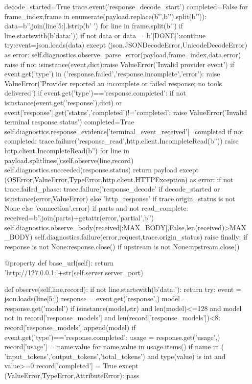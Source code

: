             decode_started=True
            trace.event('response_decode_start')
            completed=False
            for frame_index,frame in enumerate(payload.replace(b'\r\n',b'\n').split(b'\n\n')):
                data=b'\n'.join(line[5:].lstrip(b' ') for line in frame.split(b'\n') if line.startswith(b'data:'))
                if not data or data==b'[DONE]':continue
                try:event=json.loads(data)
                except (json.JSONDecodeError,UnicodeDecodeError) as error:
                    self.diagnostics.observe_parse_error(payload,frame_index,data,error)
                    raise
                if not isinstance(event,dict):raise ValueError('Invalid provider event')
                if event.get('type') in ('response.failed','response.incomplete','error'):
                    raise ValueError('Provider reported an incomplete or failed response; no tools delivered')
                if event.get('type')=='response.completed':
                    if not isinstance(event.get('response'),dict) or event['response'].get('status','completed')!='completed':
                        raise ValueError('Invalid terminal response status')
                    completed=True
            self.diagnostics.response_evidence['terminal_event_received']=completed
            if not completed:
                trace.failure('response_read',http.client.IncompleteRead(b''))
                raise http.client.IncompleteRead(b'')
            for line in payload.splitlines():self.observe(line,record)
            self.diagnostics.succeeded(response.status)
            return payload
        except (OSError,ValueError,TypeError,http.client.HTTPException) as error:
            if not trace.failed_phase:
                trace.failure('response_decode' if decode_started or isinstance(error,ValueError) else 'http_response' if trace.origin_status is not None else 'connection',error)
            if parts and not read_complete:
                received=b''.join(parts)+getattr(error,'partial',b'')
                self.diagnostics.observe_body(received[:MAX_BODY],False,len(received)>MAX_BODY)
            self.diagnostics.failure(error,request,trace.origin_status)
            raise
        finally:
            if response is not None:response.close()
            if upstream is not None:upstream.close()

    @property
    def base_url(self):
        return 'http://127.0.0.1:'+str(self.server.server_port)

    def observe(self,line,record):
        if not line.startswith(b'data:'):
            return
        try:
            event = json.loads(line[5:])
            response = event.get('response',{})
            model = response.get('model')
            if isinstance(model,str) and len(model)<=128 and model not in record['response_models'] and len(record['response_models'])<8:
                record['response_models'].append(model)
            if event.get('type')=='response.completed':
                usage = response.get('usage',{})
                record['usage'] = {name:value for name,value in usage.items() if name in (
                    'input_tokens','output_tokens','total_tokens') and type(value) is int and value>=0}
                record['completed'] = True
        except (ValueError,TypeError,AttributeError):
            pass

